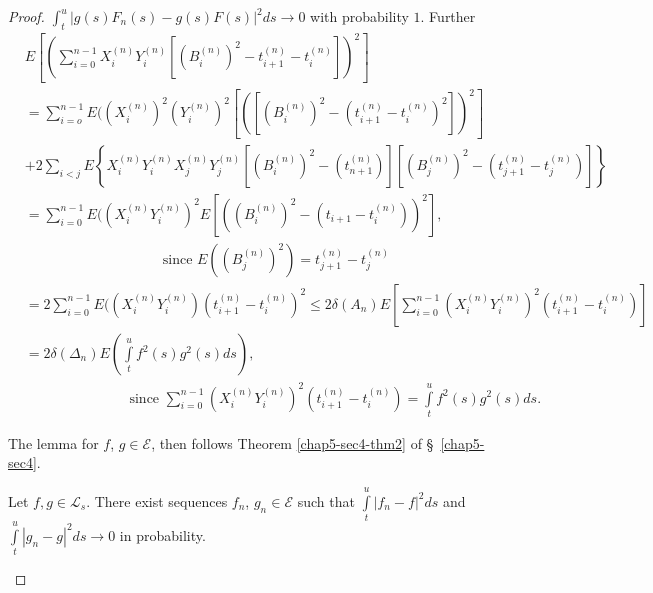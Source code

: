 \begin{proof}
  $\int^u_t | g(s) F_n (s) - g(s) F (s) |^2ds \to 0$ with probability
  $1$. Further  
\begin{align*}
  & E \left[ \left( \sum^{ n - 1}_{ i = 0} X_i^{(n)} Y_i ^{(n)} \left[ (B_i
        ^{(n)})^2 - t^{(n)}_{i +1} - t_i^{(n)}\right] \right)^2 \right] \\ 
    & = \sum_{i = o}^{n - 1} E(( X_i ^{(n)})^2 (Y_i^{(n)})^2 \left[ \left(\left[
        (B_i ^{(n)})^2 - (t^{(n)}_{i +1} - t^{(n)}_i )^2
        \right]\right)^2 \right]\\
    & + 2 \sum_{ i < j} E \left\{ X_i^{ (n)} Y_i^{(n)} X_j^{(n)} Y_j^{(n)}
    \left[ \left(B_i^{(n)}\right) ^2 - \left(t_{ n+1}^{(n)}\right)
      \right] \left[ \left(B_j^{(n)}\right)^2 
      - \left(t^{(n)}_{j+1}-t^{(n)}_{j}\right)\right] \right\} \\ 
    & = \sum^{ n - 1}_{ i = 0}E (( X_i ^{(n)} Y_i ^{(n)} ) ^ 2 E \left[
      \left((B_i ^{(n)})^2 - (t_{i +1} - t_i^{(n)})\right)^2 \right],\\
    & \hspace{4cm}\text{ since } E (( B_j ^{(n)})^2 ) = t_{ j
      +1}^{(n)} - t^{(n)}_{ j} \\ 
    & = 2 \sum^{ n - 1}_{ i = 0} E(( X_i ^{(n)} Y_i ^{(n)}) ( t^{ (n)}_{
      i +1}-t^{(n)}_{i} )^2\leq 2 \delta(A_n) E \left[ \sum^{ n - 1}_{ i = 0} (X_i ^{(n)}
      Y_i ^{(n)}) ^2 (t^{(n)}_{ i +1} - t_i ^{(n)})\right] \\ 
    & = 2\delta (\Delta _n) E \left(\int \limits^{u} _{t} f^2 (s) g^2 (s)
    ds\right), \\
    & \hspace{3cm} \text{ since } \sum^{ n -1 }_{ i =0}
    \left(X_i^{(n)}Y_i^{(n)}\right)^2 
    \left(t_{ i +1}^{(n)} - t_{ i}^{(n)}\right) = \int\limits^u_t f^2 (s) g^2 (s)
    ds.  
  \end{align*}\pageoriginale
  
The lemma for $f$, $g \in \mathscr{E}$, then follows
Theorem \ref{chap5-sec4-thm2} of \S\ \ref{chap5-sec4}.  
  \begin{case}%
    Let $f, g \in \mathscr{L}_s$. There exist sequences $f_n$, $g_n \in
    \mathscr{E}$ such that $\int\limits^{ u}_t |f_n - f|^2 ds$ and
    $\int\limits^u_t | g_n - g|^2 ds \to 0$ in probability.  
  \end{case}
  

\end{proof}
